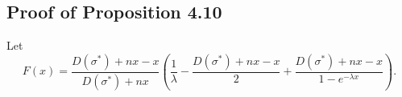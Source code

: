 \documentclass[11pt,a4paper]{article}
\begin{document}











\subsection{Proof of Proposition 4.10} \label{app: unimodality appendix}

Let
\begin{equation} \label{eqn: appendix homogeneous simple cycle}
    F(x) = 
    \frac{D(\sigma^*) + nx-x}{D(\sigma^*) + nx} \left( \frac{1}{\lambda} - \frac{D(\sigma^*) + nx-x}{2} + \frac{D(\sigma^*) + nx-x}{1-e^{-\lambda x}} \right).
\end{equation}
\end{document}

